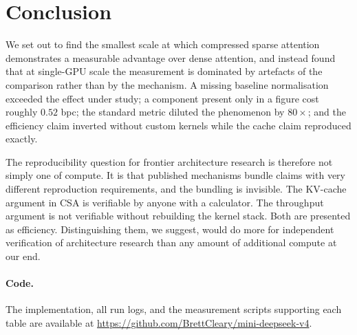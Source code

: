 \documentclass[11pt]{article}
\begin{document}
\section{Conclusion}

We set out to find the smallest scale at which compressed sparse attention
demonstrates a measurable advantage over dense attention, and instead found
that at single-GPU scale the measurement is dominated by artefacts of the
comparison rather than by the mechanism. A missing baseline normalisation
exceeded the effect under study; a component present only in a figure cost
roughly $0.52$ bpc; the standard metric diluted the phenomenon by $80\times$;
and the efficiency claim inverted without custom kernels while the cache claim
reproduced exactly.

The reproducibility question for frontier architecture research is therefore
not simply one of compute. It is that published mechanisms bundle claims with
very different reproduction requirements, and the bundling is invisible. The
KV-cache argument in CSA is verifiable by anyone with a calculator. The
throughput argument is not verifiable without rebuilding the kernel stack. Both
are presented as efficiency. Distinguishing them, we suggest, would do more for
independent verification of architecture research than any amount of additional
compute at our end.

\paragraph{Code.} The implementation, all run logs, and the measurement scripts
supporting each table are available at
\url{https://github.com/BrettCleary/mini-deepseek-v4}.
\end{document}

